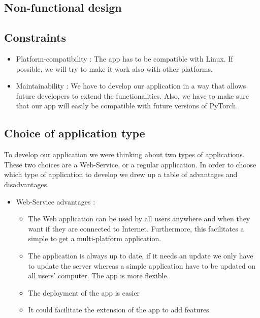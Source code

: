 \subsection{Non-functional design}

\subsection{Constraints}

\begin{itemize}
\item Platform-compatibility : The app has to be compatible with Linux. If possible, we will try to make it work also with other platforms.
\item Maintainability : We have to develop our application in a way that allows future developers to extend the functionalities. Also, we have to make sure that our app will easily be compatible with future versions of PyTorch.
\end{itemize}

\subsection{Choice of application type}

To develop our application we were thinking about two types of applications. These two choices are a Web-Service, or a regular application.
In order to choose which type of application to develop we drew up a table of advantages and disadvantages.

\begin{itemize}
    \item Web-Service advantages :
    \begin{itemize}
         \item The Web application can be used by all users anywhere and when they want if they are connected to Internet. Furthermore, this facilitates a simple to get a multi-platform application.
        \item The application is always up to date, if it needs an update we only have to update the server whereas a simple application have to be updated on all users' computer. The app is more flexible.
        \item The deployment of the app is easier
        \item It could facilitate the extension of the app to add features
    \end{itemize}
\end{itemize}

